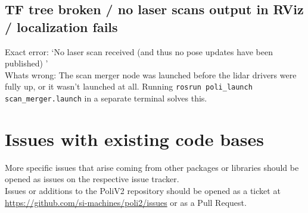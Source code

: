 \subsection{TF tree broken / no laser scans output in RViz / localization fails}
Exact error: `No laser scan received (and thus no pose updates have been published) ' \\

Whats wrong: The scan merger node was launched before the lidar drivers were fully up, or it wasn't launched at all. Running \texttt{rosrun poli\_launch scan\_merger.launch} in a separate terminal solves this.


\section{Issues with existing code bases}

More specific issues that arise coming from other packages or libraries should be opened as issues on the respective issue tracker. \\

Issues or additions to the PoliV2 repository should be opened as a ticket at \href{https://github.com/si-machines/poli2/issues}{https://github.com/si-machines/poli2/issues} or as a Pull Request.
  